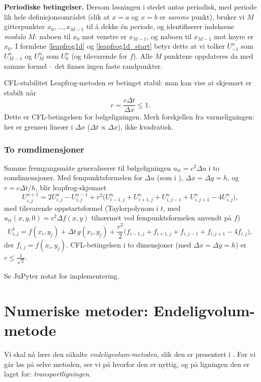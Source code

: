\textbf{Periodiske betingelser.} Dersom løsningen i stedet antas periodisk, med periode lik hele definisjonsområdet (slik at $x=a$ og $x=b$ er \emph{samme} punkt), bruker vi $M$ gitterpunkter $x_0,\ldots,x_{M-1}$ til å dekke én periode, og identifiserer indeksene \emph{modulo} $M$: naboen til $x_0$ mot venstre er $x_{M-1}$, og naboen til $x_{M-1}$ mot høyre er $x_0$. I formlene \eqref{leapfrog1d} og \eqref{leapfrog1d_start} betyr dette at vi tolker $U_{-1}^n$ som $U_{M-1}^n$ og $U_M^n$ som $U_0^n$ (og tilsvarende for $f$). Alle $M$ punktene oppdateres da med samme formel -- det finnes ingen faste randpunkter.

\begin{rem}{CFL-stabilitet}
Leapfrog-metoden er betinget stabil: man kan vise at skjemaet er stabilt når
\[
r = \frac{c\Delta t}{\Delta x} \leq 1.
\]
Dette er CFL-betingelsen for bølgeligningen. Merk forskjellen fra varmeligningen: her er grensen lineær i $\Delta x$ ($\Delta t \propto \Delta x$), ikke kvadratisk.
\end{rem}

\subsubsection*{To romdimensjoner}
Samme fremgangsmåte generaliserer til bølgeligningen $u_{tt}=c^2\Delta u$ i to romdimensjoner. Med fempunktsformelen for $\Delta u$ (som i ), $\Delta x=\Delta y=h$, og $r=c\Delta t/h$, blir leapfrog-skjemaet
\begin{equation}\label{leapfrog2d}
U_{i,j}^{n+1} = 2U_{i,j}^n - U_{i,j}^{n-1} + r^2\Big(U_{i-1,j}^n+U_{i+1,j}^n+U_{i,j-1}^n+U_{i,j+1}^n - 4U_{i,j}^n\Big),
\end{equation}
med tilsvarende oppstartsformel (Taylorpolynom i $t$, med $u_{tt}(x,y,0)=c^2\Delta f(x,y)$ tilnærmet ved fempunktsformelen anvendt på $f$)
\[
U_{i,j}^1 = f(x_i,y_j) + \Delta t\, g(x_i,y_j) + \frac{r^2}{2}\Big(f_{i-1,j}+f_{i+1,j}+f_{i,j-1}+f_{i,j+1}-4f_{i,j}\Big),
\]
der $f_{i,j}=f(x_i,y_j)$. CFL-betingelsen i to dimensjoner (med $\Delta x=\Delta y=h$) er $r\leq \frac{1}{\sqrt2}$.

Se JuPyter notat for implementering.

\section{Numeriske metoder: Endeligvolum-metode}\label{sect:endeligvolum}
\label{sec:EndeligVolum}
Vi skal nå lære den såkalte \emph{endeligvolum-metoden}, slik den er presentert i \cite[Chapter 2 og 4]{VaM07}. Før vi går løs på selve metoden, ser vi på hvorfor den er nyttig, og på ligningen den er laget for: \emph{transportligningen}.

